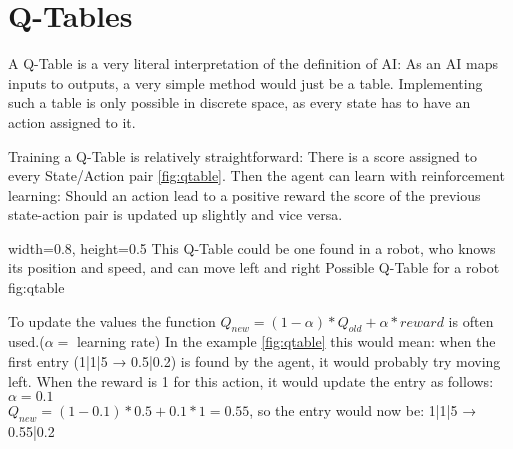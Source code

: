 \section{Q-Tables}
\label{sec:QTable}
\cite[TicTacToe Example]{c4f}
A Q-Table is a very literal interpretation of the definition of AI: As an AI maps inputs to outputs, a very simple method would just be a table. Implementing such a table is only possible in discrete space, as every state has to have an action assigned to it.

Training a Q-Table is relatively straightforward: There is a score assigned to every State/Action pair \autoref{fig:qtable}. Then the agent can learn with reinforcement learning: Should an action lead to a positive reward the score of the previous state-action pair is updated up slightly and vice versa.

    {width=0.8\textwidth, height=0.5\textheight} %
    {This Q-Table could be one found in a robot, who knows its position and speed, and can move left and right}   %
    {Possible Q-Table for a robot}   %
    {fig:qtable}    %

To update the values the function $Q_{new}=(1-\alpha)*Q_{old}+\alpha*reward$ is often used.($\alpha=$ learning rate)
In the example \autoref{fig:qtable} this would mean: when the first entry (1|1|5 → 0.5|0.2) is found by the agent, it would probably try moving left. When the reward is 1 for this action, it would update the entry as follows: $\alpha=0.1$\\$Q_{new}=(1-0.1)*0.5+0.1*1=0.55$, so the entry would now be: 1|1|5 → 0.55|0.2

